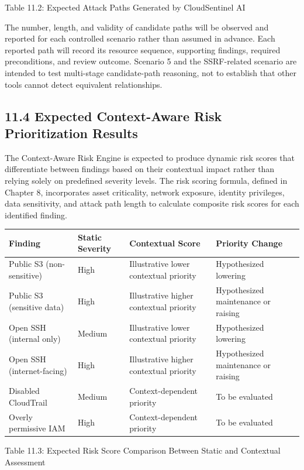 Table 11.2: Expected Attack Paths Generated by CloudSentinel AI

The number, length, and validity of candidate paths will be observed and reported for each controlled scenario rather than assumed in advance. Each reported path will record its resource sequence, supporting findings, required preconditions, and review outcome. Scenario 5 and the SSRF-related scenario are intended to test multi-stage candidate-path reasoning, not to establish that other tools cannot detect equivalent relationships.

\subsection{11.4 Expected Context-Aware Risk Prioritization Results}

The Context-Aware Risk Engine is expected to produce dynamic risk scores that differentiate between findings based on their contextual impact rather than relying solely on predefined severity levels. The risk scoring formula, defined in Chapter 8, incorporates asset criticality, network exposure, identity privileges, data sensitivity, and attack path length to calculate composite risk scores for each identified finding.

\begin{longtable}[]{@{}llll@{}}
\toprule\noalign{}
Finding & Static Severity & Contextual Score & Priority Change \\
\midrule\noalign{}
\endhead
\bottomrule\noalign{}
\endlastfoot
Public S3 (non-sensitive) & High & Illustrative lower contextual priority & Hypothesized lowering \\
Public S3 (sensitive data) & High & Illustrative higher contextual priority & Hypothesized maintenance or raising \\
Open SSH (internal only) & Medium & Illustrative lower contextual priority & Hypothesized lowering \\
Open SSH (internet-facing) & High & Illustrative higher contextual priority & Hypothesized maintenance or raising \\
Disabled CloudTrail & Medium & Context-dependent priority & To be evaluated \\
Overly permissive IAM & High & Context-dependent priority & To be evaluated \\
\end{longtable}

Table 11.3: Expected Risk Score Comparison Between Static and Contextual Assessment

